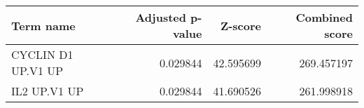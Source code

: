 \begin{tabular}{lrrr}
\toprule
         Term name &  Adjusted p-value &   Z-score &  Combined score \\
\midrule
CYCLIN D1 UP.V1 UP &          0.029844 & 42.595699 &      269.457197 \\
      IL2 UP.V1 UP &          0.029844 & 41.690526 &      261.998918 \\
\bottomrule
\end{tabular}
